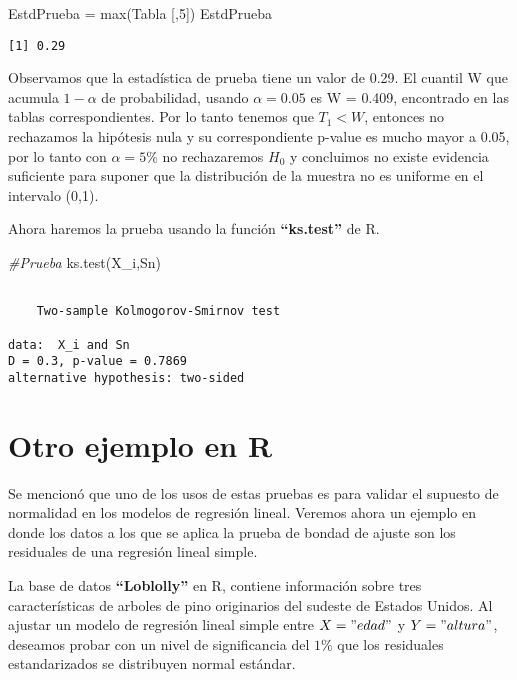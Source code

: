 \documentclass[
  a4paper,
  oneside,
  openany]{book}
\newenvironment{Shaded}{\begin{snugshade}}{\end{snugshade}}
\newcommand{\CommentTok}[1]{\textcolor[rgb]{0.56,0.35,0.01}{\textit{#1}}}
\newcommand{\DecValTok}[1]{\textcolor[rgb]{0.00,0.00,0.81}{#1}}
\newcommand{\FunctionTok}[1]{\textcolor[rgb]{0.00,0.00,0.00}{#1}}
\newcommand{\NormalTok}[1]{#1}
\newcommand{\OtherTok}[1]{\textcolor[rgb]{0.56,0.35,0.01}{#1}}
\begin{document}
\begin{Shaded}
\begin{Highlighting}[]
\NormalTok{EstdPrueba }\OtherTok{=} \FunctionTok{max}\NormalTok{(Tabla [,}\DecValTok{5}\NormalTok{])}
\NormalTok{EstdPrueba}
\end{Highlighting}
\end{Shaded}

\begin{verbatim}
[1] 0.29
\end{verbatim}

Observamos que la estadística de prueba tiene un valor de 0.29. El cuantil W que acumula \(1-\alpha\) de probabilidad, usando \(\alpha=0.05\) es W = 0.409, encontrado en las tablas correspondientes. Por lo tanto tenemos que \(T_1 < W\), entonces no rechazamos la hipótesis nula y su correspondiente p-value es mucho mayor a 0.05, por lo tanto con \(\alpha=5\%\) no rechazaremos \(H_0\) y concluimos no existe evidencia suficiente para suponer que la distribución de la muestra no es uniforme en el intervalo (0,1).

Ahora haremos la prueba usando la función \textbf{``ks.test''} de R.

\begin{Shaded}
\begin{Highlighting}[]
\CommentTok{\#Prueba}
\FunctionTok{ks.test}\NormalTok{(X\_i,Sn)}
\end{Highlighting}
\end{Shaded}

\begin{verbatim}

    Two-sample Kolmogorov-Smirnov test

data:  X_i and Sn
D = 0.3, p-value = 0.7869
alternative hypothesis: two-sided
\end{verbatim}

\hypertarget{otro-ejemplo-en-r}{%
\section{Otro ejemplo en R}\label{otro-ejemplo-en-r}}

Se mencionó que uno de los usos de estas pruebas es para validar el supuesto de normalidad en los modelos de regresión lineal. Veremos ahora un ejemplo en donde los datos a los que se aplica la prueba de bondad de ajuste son los residuales de una regresión lineal simple.

La base de datos \textbf{``Loblolly''} en R, contiene información sobre tres características de arboles de pino originarios del sudeste de Estados Unidos. Al ajustar un modelo de regresión lineal simple entre \(X="edad"\) y \(Y="altura"\), deseamos probar con un nivel de significancia del \(1\%\) que los residuales estandarizados se distribuyen normal estándar.
\end{document}
